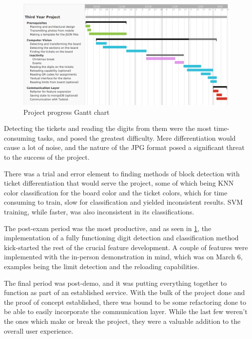 \documentclass[12pt]{report}
\theoremstyle{definition}
\theoremstyle{remark}
\begin{document}
\begin{figure}[h]
    \centering
    \includegraphics[width=\textwidth]{img/gantt_chart.png}
    \caption{Project progress Gantt chart}
    \label{fig:gantt}
\end{figure}

Detecting the tickets and reading the digits from them were the most time-consuming tasks, and posed the greatest difficulty. Mere differentiation would cause a lot of noise, and the nature of the JPG format posed a significant threat to the success of the project.

There was a trial and error element to finding methods of block detection with ticket differentiation that would serve the project, some of which being KNN color classification for the board color and the ticket colors, which for time consuming to train, slow for classification and yielded inconsistent results. SVM training, while faster, was also inconsistent in its classifications.

The post-exam period was the most productive, and as seen in \ref{fig:gantt}, the implementation of a fully functioning digit detection and classification method kick-started the rest of the crucial feature development. A couple of features were implemented with the in-person demonstration in mind, which was on March 6, examples being the limit detection and the reloading capabilities.

The final period was post-demo, and it was putting everything together to function as part of an established service. With the bulk of the project done and the proof of concept established, there was bound to be some refactoring done to be able to easily incorporate the communication layer. While the last few weren't the ones which make or break the project, they were a valuable addition to the overall user experience.
\end{document}
